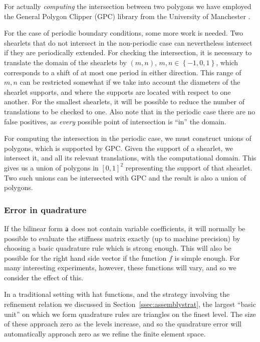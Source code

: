 For actually {\em computing} the intersection between two polygons we have employed the General Polygon
Clipper (GPC) library from the University of Manchester \cite{GPC}.

For the case of periodic boundary conditions, some more work is needed. Two shearlets that do not intersect in
the non-periodic case can nevertheless intersect if they are periodically extended. For checking the
intersection, it is necessary to translate the domain of the shearlets by $(m,n)$,
$m,n\in\left\{-1,0,1\right\}$, which corresponds to a shift of at most one period in either direction. This
range of $m,n$ can be restricted somewhat if we take into account the diameters of the shearlet supports, and
where the supports are located with respect to one another. For the smallest shearlets, it will be possible to
reduce the number of translations to be checked to one. Also note that in the periodic case there are no false
positives, as {\em every} possible point of intersection is ``in'' the domain.

For computing the intersection in the periodic case, we must construct unions of polygons, which is supported
by GPC.  Given the support of a shearlet, we intersect it, and all its relevant translations, with the
computational domain. This gives us a union of polygons in $[0,1]^2$ representing the support of that
shearlet. Two such unions can be intersected with GPC and the result is also a union of polygons.

\subsubsection{Error in quadrature} \label{sec:error-in-quadrature}

If the bilinear form ${\sf a}$ does not contain variable coefficients, it will normally be possible to evaluate
the stiffness matrix exactly (up to machine precision) by choosing a basic quadrature rule which is strong
enough. This will also be possible for the right hand side vector if the function $f$ is simple enough. For
many interesting experiments, however, these functions will vary, and so we consider the effect of this.

In a traditional setting with hat functions, and the strategy involving the refinement relation we discussed
in Section~\ref{ssec:assemblystrat}, the largest ``basic unit'' on which we form quadrature rules are
triangles on the finest level. The size of these approach zero as the levels increase, and so the quadrature
error will automatically approach zero as we refine the finite element space.

